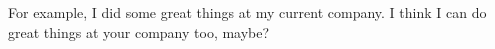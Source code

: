 For example, I did some great things at my current company. 
I think I can do great things at your company too, maybe?
